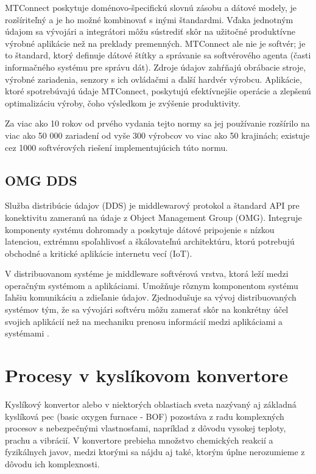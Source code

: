 \documentclass[]{tukediphc}
\begin{document}
MTConnect poskytuje doménovo-špecifickú slovnú zásobu a dátové modely, je rozšíriteľný a je ho možné kombinovať s inými štandardmi. Vďaka jednotným údajom sa vývojári a integrátori môžu sústrediť skôr na užitočné produktívne výrobné aplikácie než na preklady premenných. MTConnect ale nie je softvér; je to štandard, ktorý definuje dátové štítky a správanie sa softvérového agenta (časti informačného systému pre správu dát). Zdroje údajov zahŕňajú obrábacie stroje, výrobné zariadenia, senzory s ich ovládačmi a ďalší hardvér výrobcu. Aplikácie, ktoré spotrebúvajú údaje MTConnect, poskytujú efektívnejšie operácie a zlepšenú optimalizáciu výroby, čoho výsledkom je zvýšenie produktivity.

Za viac ako 10 rokov od prvého vydania tejto normy sa jej používanie rozšírilo na viac ako 50 000 zariadení od vyše 300 výrobcov vo viac ako 50 krajinách; existuje cez 1000 softvérových riešení implementujúcich túto normu.

\subsection{OMG DDS}

Služba distribúcie údajov (DDS) je middlewarový protokol a štandard API pre konektivitu zameranú na údaje z Object Management Group (OMG). Integruje komponenty systému dohromady a poskytuje dátové pripojenie s nízkou latenciou, extrémnu spoľahlivosť a škálovateľnú architektúru, ktorú potrebujú obchodné a kritické aplikácie internetu vecí (IoT).

V distribuovanom systéme je middleware softvérová vrstva, ktorá leží medzi operačným systémom a aplikáciami. Umožňuje rôznym komponentom systému ľahšiu komunikáciu a zdieľanie údajov. Zjednodušuje sa vývoj distribuovaných systémov tým, že sa vývojári softvéru môžu zamerať skôr na konkrétny účel svojich aplikácií než na mechaniku prenosu informácií medzi aplikáciami a systémami \citep{ddsfoundation}.






\section{Procesy v kyslíkovom konvertore}

Kyslíkový konvertor alebo v niektorých oblastiach sveta nazývaný aj základná kyslíková pec (basic oxygen furnace - BOF) pozostáva z radu komplexných procesov s nebezpečnými vlastnosťami, napríklad z dôvodu vysokej teploty, prachu a vibrácií. V konvertore prebieha  množstvo chemických reakcií a fyzikálnych javov, medzi ktorými sa nájdu aj také, ktorým úplne nerozumieme z dôvodu ich komplexnosti.
\end{document}
